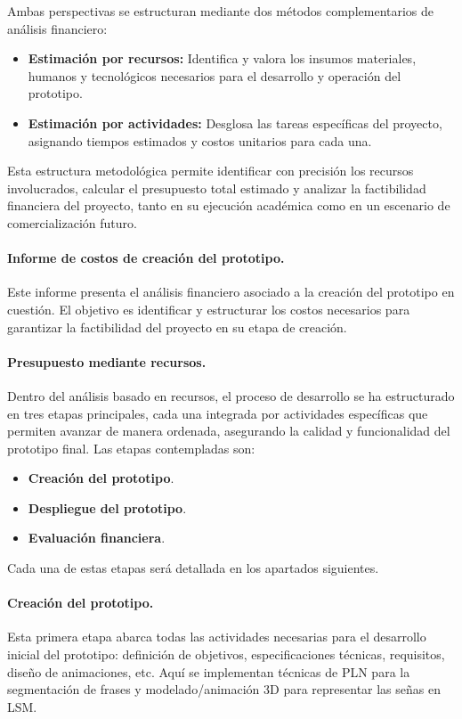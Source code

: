 Ambas perspectivas se estructuran mediante dos métodos complementarios de análisis financiero:

\begin{itemize}
	\item \textbf{Estimación por recursos:} Identifica y valora los insumos materiales, humanos y tecnológicos necesarios para el desarrollo y operación del prototipo.
	\item \textbf{Estimación por actividades:} Desglosa las tareas específicas del proyecto, asignando tiempos estimados y costos unitarios para cada una.
\end{itemize}

Esta estructura metodológica permite identificar con precisión los recursos involucrados, calcular el presupuesto total estimado y analizar la factibilidad financiera del proyecto, tanto en su ejecución académica como en un escenario de comercialización futuro.

\paragraph{\textbf{Informe de costos de creación del prototipo.}} 
Este informe presenta el análisis financiero asociado a la creación del prototipo en cuestión. El objetivo es identificar y estructurar los costos necesarios para garantizar la factibilidad del proyecto en su etapa de creación.

\paragraph{\textbf{Presupuesto mediante recursos.}} 
Dentro del análisis basado en recursos, el proceso de desarrollo se ha estructurado en tres etapas principales, cada una integrada por actividades específicas que permiten avanzar de manera ordenada, asegurando la calidad y funcionalidad del prototipo final. Las etapas contempladas son:

\begin{itemize}
	\item \textbf{Creación del prototipo}. 
	\item \textbf{Despliegue del prototipo}.
	\item \textbf{Evaluación financiera}. 
\end{itemize}

Cada una de estas etapas será detallada en los apartados siguientes.

\paragraph{\textbf{Creación del prototipo.}} 
Esta primera etapa abarca todas las actividades necesarias para el desarrollo inicial del prototipo: definición de objetivos, especificaciones técnicas, requisitos, diseño de animaciones, etc. Aquí se implementan técnicas de PLN para la segmentación de frases y modelado/animación 3D para representar las señas en LSM.

